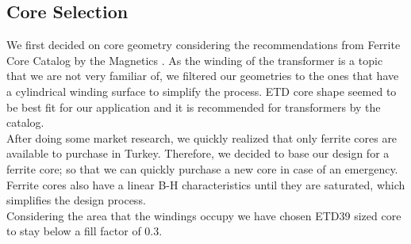 \subsection{Core Selection}
We first decided on core geometry considering the recommendations from Ferrite Core Catalog by the Magnetics \cite{web:ferrite_cores}. As the winding of the transformer is a topic that we are not very familiar of, we filtered our geometries to the ones that have a cylindrical winding surface to simplify the process. ETD core shape seemed to be best fit for our application and it is recommended for transformers by the catalog. \\
After doing some market research, we quickly realized that only ferrite cores are available to purchase in Turkey. Therefore, we decided to base our design for a ferrite core; so that we can quickly purchase a new core in case of an emergency. Ferrite cores also have a linear B-H characteristics until they are saturated, which simplifies the design process. \\
Considering the area that the windings occupy we have chosen ETD39 sized core to stay below a fill factor of 0.3.
